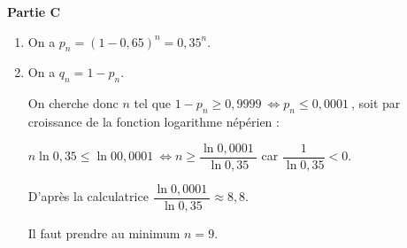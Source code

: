 \documentclass[10pt]{article}
\providecommand{\np}[2][]{{#2~#1}}
\begin{document}
\textbf{Partie C}

\medskip







\medskip

\begin{enumerate}
\item 
On a $p_n = (1 - 0,65)^n = 0,35^n$.

\item On a $q_n = 1 - p_n$.

On cherche donc $n$ tel que $1 - p_n \geqslant \np{0,9999} \iff p_n \leqslant \np{0,0001}$, soit par croissance de la fonction logarithme népérien :

$n\ln 0,35 \leqslant \ln 0\np{0,0001} \iff n \geqslant \dfrac{\ln \np{0,0001}}{\ln 0,35}$ car $\dfrac{1}{\ln 0,35} < 0$.

D'après la calculatrice $\dfrac{\ln \np{0,0001}}{\ln 0,35} \approx 8,8$.

Il faut prendre au minimum $n = 9$.



\end{enumerate}
\end{document}
